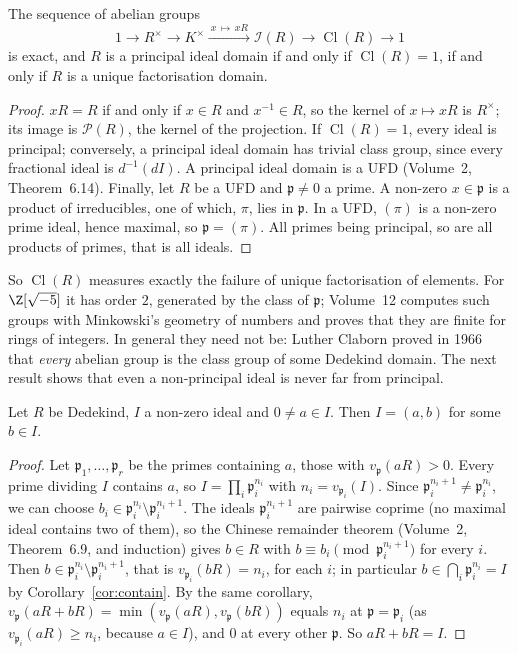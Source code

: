 \begin{proposition}\label{prop:classseq}
The sequence of abelian groups
\[
1\longrightarrow R^\times\longrightarrow K^\times\xrightarrow{\ x\,\mapsto\, xR\ }\mathcal I(R)\longrightarrow\operatorname{Cl}(R)\longrightarrow1
\]
is exact, and $R$ is a principal ideal domain if and only if $\operatorname{Cl}(R)=1$, if and only if $R$ is a unique factorisation domain.
\end{proposition}

\begin{proof}
$xR=R$ if and only if $x\in R$ and $x^{-1}\in R$, so the kernel of $x\mapsto xR$ is $R^\times$; its image is $\mathcal P(R)$, the kernel of the projection. If $\operatorname{Cl}(R)=1$, every ideal is principal; conversely, a principal ideal domain
has trivial class group, since every fractional ideal is $d^{-1}(dI)$. A principal ideal domain is a UFD (Volume~2, Theorem~6.14). Finally, let $R$ be a UFD and $\mathfrak p\ne0$ a prime. A non-zero $x\in\mathfrak p$ is a product of
irreducibles, one of which, $\pi$, lies in $\mathfrak p$. In a UFD, $(\pi)$ is a non-zero prime ideal, hence maximal, so $\mathfrak p=(\pi)$. All primes being principal, so are all products of primes, that is all ideals.
\end{proof}

So $\operatorname{Cl}(R)$ measures exactly the failure of unique factorisation of elements. For $\Z[\sqrt{-5}]$ it has order $2$, generated by the class of $\mathfrak p$; Volume~12 computes such groups with Minkowski's geometry of
numbers and proves that they are finite for rings of integers. In general they need not be: Luther Claborn proved in 1966 that \emph{every} abelian group is the class group of some Dedekind domain. The next result shows that
even a non-principal ideal is never far from principal.

\begin{proposition}\label{prop:twogen}
Let $R$ be Dedekind, $I$ a non-zero ideal and $0\ne a\in I$. Then $I=(a,b)$ for some $b\in I$.
\end{proposition}

\begin{proof}
Let $\mathfrak p_1,\dots,\mathfrak p_r$ be the primes containing $a$, those with $v_{\mathfrak p}(aR)>0$. Every prime dividing $I$ contains $a$, so $I=\prod_i\mathfrak p_i^{n_i}$ with $n_i=v_{\mathfrak p_i}(I)$. Since $\mathfrak p_i^{n_i+1}\ne\mathfrak p_i^{n_i}$, we
can choose $b_i\in\mathfrak p_i^{n_i}\setminus\mathfrak p_i^{n_i+1}$. The ideals $\mathfrak p_i^{n_i+1}$ are pairwise coprime (no maximal ideal contains two of them), so the Chinese remainder theorem (Volume~2, Theorem~6.9, and induction) gives
$b\in R$ with $b\equiv b_i\pmod{\mathfrak p_i^{n_i+1}}$ for every $i$. Then $b\in\mathfrak p_i^{n_i}\setminus\mathfrak p_i^{n_i+1}$, that is $v_{\mathfrak p_i}(bR)=n_i$, for each $i$; in particular $b\in\bigcap_i\mathfrak p_i^{n_i}=I$ by
Corollary~\ref{cor:contain}. By the same corollary, $v_{\mathfrak p}(aR+bR)=\min(v_{\mathfrak p}(aR),v_{\mathfrak p}(bR))$ equals $n_i$ at $\mathfrak p=\mathfrak p_i$ (as $v_{\mathfrak p_i}(aR)\ge n_i$, because $a\in I$), and $0$ at every other $\mathfrak p$. So
$aR+bR=I$.
\end{proof}

